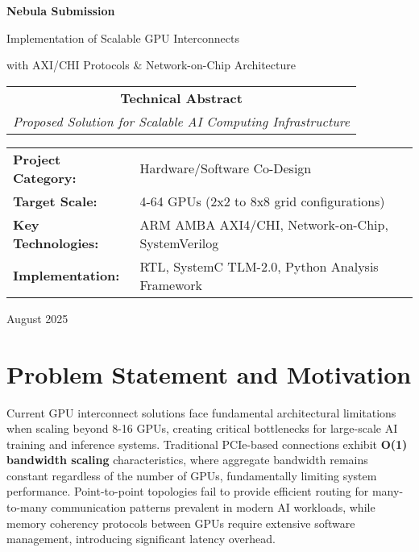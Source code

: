 \documentclass[11pt,a4paper]{article}
\begin{document}
\begin{titlepage}
    \centering
    \vspace*{2cm}
    
    {\Huge\textcolor{nebulablue}{\textbf{Nebula Submission}}}
    
    \vspace{0.5cm}
    {\Large\textcolor{nebulagray}{Implementation of Scalable GPU Interconnects}}
    
    \vspace{0.3cm}
    {\large\textcolor{nebulagray}{with AXI/CHI Protocols \& Network-on-Chip Architecture}}
    
    \vspace{2cm}
    
    \begin{tabular}{c}
        \textbf{\Large Technical Abstract} \\
        \textit{Proposed Solution for Scalable AI Computing Infrastructure}
    \end{tabular}
    
    \vspace{2cm}
    
    \begin{tabular}{ll}
        \textbf{Project Category:} & Hardware/Software Co-Design \\
        \textbf{Target Scale:} & 4-64 GPUs (2x2 to 8x8 grid configurations) \\
        \textbf{Key Technologies:} & ARM AMBA AXI4/CHI, Network-on-Chip, SystemVerilog \\
        \textbf{Implementation:} & RTL, SystemC TLM-2.0, Python Analysis Framework \\
    \end{tabular}
    
    \vfill
    
    {\large August 2025}
\end{titlepage}

\newpage

\section{Problem Statement and Motivation}

Current GPU interconnect solutions face fundamental architectural limitations when scaling beyond 8-16 GPUs, creating critical bottlenecks for large-scale AI training and inference systems. Traditional PCIe-based connections exhibit \textbf{O(1) bandwidth scaling} characteristics, where aggregate bandwidth remains constant regardless of the number of GPUs, fundamentally limiting system performance. Point-to-point topologies fail to provide efficient routing for many-to-many communication patterns prevalent in modern AI workloads, while memory coherency protocols between GPUs require extensive software management, introducing significant latency overhead.
\end{document}
